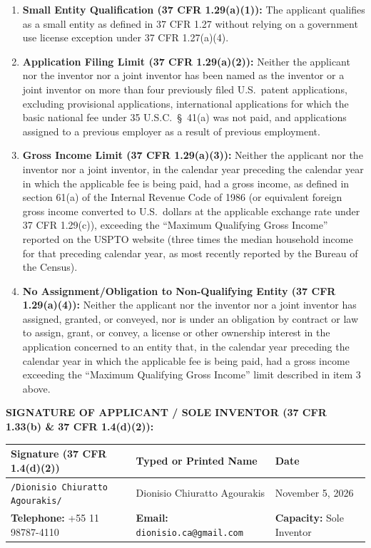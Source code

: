 \documentclass[11pt,letterpaper]{article}
\begin{document}
\begin{enumerate}
    \item \textbf{Small Entity Qualification (37 CFR 1.29(a)(1)):} The applicant qualifies as a small entity as defined in 37 CFR 1.27 without relying on a government use license exception under 37 CFR 1.27(a)(4).
    \item \textbf{Application Filing Limit (37 CFR 1.29(a)(2)):} Neither the applicant nor the inventor nor a joint inventor has been named as the inventor or a joint inventor on more than four previously filed U.S.\ patent applications, excluding provisional applications, international applications for which the basic national fee under 35 U.S.C.\ \S\ 41(a) was not paid, and applications assigned to a previous employer as a result of previous employment.
    \item \textbf{Gross Income Limit (37 CFR 1.29(a)(3)):} Neither the applicant nor the inventor nor a joint inventor, in the calendar year preceding the calendar year in which the applicable fee is being paid, had a gross income, as defined in section 61(a) of the Internal Revenue Code of 1986 (or equivalent foreign gross income converted to U.S.\ dollars at the applicable exchange rate under 37 CFR 1.29(c)), exceeding the ``Maximum Qualifying Gross Income'' reported on the USPTO website (three times the median household income for that preceding calendar year, as most recently reported by the Bureau of the Census).
    \item \textbf{No Assignment/Obligation to Non-Qualifying Entity (37 CFR 1.29(a)(4)):} Neither the applicant nor the inventor nor a joint inventor has assigned, granted, or conveyed, nor is under an obligation by contract or law to assign, grant, or convey, a license or other ownership interest in the application concerned to an entity that, in the calendar year preceding the calendar year in which the applicable fee is being paid, had a gross income exceeding the ``Maximum Qualifying Gross Income'' limit described in item 3 above.
\end{enumerate}

\vspace{8pt}
\textbf{SIGNATURE OF APPLICANT / SOLE INVENTOR (37 CFR 1.33(b) \& 37 CFR 1.4(d)(2)):}\\[4pt]
\begin{tabular}{|p{2.6in}|p{2.3in}|p{1.6in}|}
\hline
\textbf{Signature (37 CFR 1.4(d)(2))} & \textbf{Typed or Printed Name} & \textbf{Date} \\
\hline
\rule{0pt}{18pt}\texttt{/Dionisio Chiuratto Agourakis/} & Dionisio Chiuratto Agourakis & November 5, 2026 \\
\hline
\textbf{Telephone:} +55 11 98787-4110 & \textbf{Email:} \texttt{dionisio.ca@gmail.com} & \textbf{Capacity:} Sole Inventor \\
\hline
\end{tabular}
\end{document}
